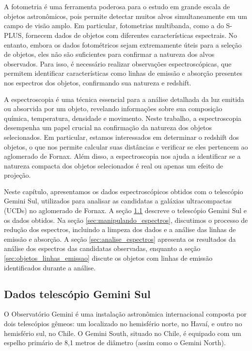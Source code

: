 \chapter{\chapternamespectra}\label{chap:spectra}
A fotometria é uma ferramenta poderosa para o estudo em grande escala de objetos astronômicos, pois permite detectar muitos alvos simultaneamente em um campo de visão amplo. Em particular, fotometrias multibanda, como a do S-PLUS, fornecem dados de objetos com diferentes características espectrais. No entanto, embora os dados fotométricos sejam extremamente úteis para a seleção de objetos, eles não são suficientes para confirmar a natureza dos alvos observados. Para isso, é necessário realizar observações espectroscópicas, que permitem identificar características como linhas de emissão e absorção presentes nos espectros dos objetos, confirmando sua natureza e redshift.

A espectroscopia é uma técnica essencial para a análise detalhada da luz emitida ou absorvida por um objeto, revelando informações sobre sua composição química, temperatura, densidade e movimento. Neste trabalho, a espectroscopia desempenha um papel crucial na confirmação da natureza dos objetos selecionados. Em particular, estamos interessados em determinar o redshift dos objetos, o que nos permite calcular suas distâncias e verificar se eles pertencem ao aglomerado de Fornax. Além disso, a espectroscopia nos ajuda a identificar se a natureza compacta dos objetos selecionados é real ou apenas um efeito de projeção.

Neste capítulo, apresentamos os dados espectroscópicos obtidos com o telescópio Gemini Sul, utilizados para analisar as candidatas a galáxias ultracompactas (UCDs) no aglomerado de Fornax. A seção \ref{sec:gemini} descreve o telescópio Gemini Sul e os dados obtidos. Na seção \ref{sec:manipulando_espectros}, discutimos o processo de redução dos espectros, incluindo a limpeza dos dados e a análise das linhas de emissão e absorção. A seção \ref{sec:analise_espectros} apresenta os resultados da análise dos espectros das candidatas observadas, enquanto a seção \ref{sec:objetos_linhas_emissao} discute os objetos com linhas de emissão identificados durante a análise.

\section{Dados telescópio Gemini Sul}\label{sec:gemini}
O Observatório Gemini é uma instalação astronômica internacional composta por dois telescópios gêmeos: um localizado no hemisfério norte, no Havaí, e outro no hemisfério sul, no Chile. O Gemini South, situado no Chile, é equipado com um espelho primário de 8,1 metros de diâmetro (assim como o Gemini North).


